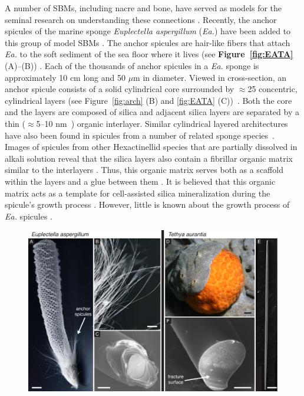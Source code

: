 \documentclass[12pt,onecolumn]{article}
\makeatletter
\newcommand{\EA}{\textit{Ea.\@}\xspace}
\makeatother
\begin{document}
\begin{bibunit}
A number of SBMs, including nacre and bone, have served as models for the seminal research on understanding these connections \cite{jackson1988,currey1977}. Recently, the anchor spicules of the marine sponge \textit{Euplectella aspergillum} (\EA) have been added to this group of model SBMs \cite{mayer2005rigid,mayer2011new,kolednik2011bioinspired,walter2007mechanisms}. The anchor spicules are hair-like fibers that attach \EA to the soft sediment of the sea floor where it lives (see {\bf Figure~\ref{fig:EATA}} (A)--(B)) \cite{weaver2007hierarchical}. Each of the thousands of anchor spicules in a \EA sponge is approximately 10 cm long and 50 $\mu$m in diameter. Viewed in cross-section, an anchor spicule consists of a solid cylindrical core surrounded by $\approx$25 concentric, cylindrical layers (see Figure~\ref{fig:arch} (B) and \ref{fig:EATA} (C))~\cite{aizenberg2005skeleton,weaver2007hierarchical,monn2015new}. Both the core and the layers are composed of silica and adjacent silica layers are separated by a thin ($\approx$5--10 nm~\cite{weaver2007hierarchical}) organic interlayer.
Similar cylindrical layered architectures have also been found in spicules from a number of related sponge species~\cite{sarikaya2001biomimetic,weaver2010unifying,levi1989remarkably,wang2010silica}. Images of spicules from other Hexactinellid species that are partially dissolved in alkali solution reveal that the silica layers also contain a fibrillar organic matrix similar to the interlayers \cite{ehrlich2006modern, ehrlich2008nanostructural, ehrlich2010mineralization}. Thus, this organic matrix serves both as a scaffold within the layers and a glue between them \cite{ehrlich2016supercontinuum}. 
%
%
It is believed that this organic matrix acts as a template for cell-assisted silica mineralization during the spicule's growth process \cite{ehrlich2006modern, ehrlich2008nanostructural, ehrlich2010mineralization, wysokowski2018biosilica}. However, little is known about the growth process of \EA spicules \cite{wysokowski2018biosilica}.
%
			\begin{figure}[ht!]
			\centering
			\includegraphics[width=\textwidth]{../Figures/FigureEATA/Figure2_V3.pdf}

\end{figure}
\end{bibunit}
\end{document}
